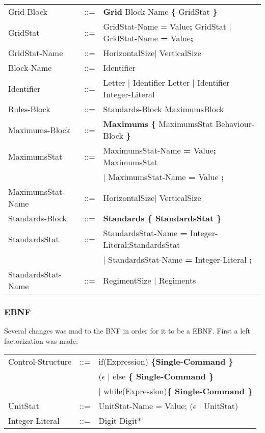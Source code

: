 \begin{tabular}{ l l l }
			Grid-Block		   &	::=	 & {\bf Grid} Block-Name	 {\bf \{} GridStat \bf{\}} \\
			GridStat		   &	::=  & GridStat-Name = Value{\bf ;} GridStat $\mid$ GridStat-Name {\bf =} Value{\bf ;}   \\
			GridStat-Name	   &	::=  & HorizontalSize$\mid$ VerticalSize					\\
			Block-Name		   &	::=  & Identifier							\\
			Identifier		   &    ::=  & Letter $\mid$ Identifier Letter $\mid$ Identifier Integer-Literal \\
			Rules-Block		   &	::=	 & Standards-Block MaximumsBlock 				\\
			Maximums-Block	   &	::=	 & {\bf Maximums} {\bf \{} MaximumsStat Behaviour-Block {\bf \}}	\\
			MaximumsStat	   &	::=  & MaximumsStat-Name {\bf = } Value{\bf ;} MaximumsStat  			\\
							   &		 & $\mid$ MaximumsStat-Name {\bf = } Value {\bf ; }	 			 \\
			MaximumsStat-Name  &	::=  & HorizontalSize$\mid$ VerticalSize							\\
			Standards-Block	   &    ::=  & \bf{Standards} {\bf \{ } StandardsStat \bf{\} }					\\
			StandardsStat	   & 	::=	 & StandardsStat-Name {\bf = } Integer-Literal;StandardsStat 				\\
							   &		 & $\mid$ StandardsStat-Name {\bf = } Integer-Literal {\bf ; } 		\\
			StandardsStat-Name & 	::=	 & RegimentSize	$\mid$ Regiments									 \\
		\end{tabular}
		
	\subsubsection{EBNF}
		Several changes was mad to the BNF in order for it to be a EBNF. First a left factorization was made:
		\begin{tabular}{ l l l }
			Control-Structure  &  	::=  & if(Expression) \bf{\{}Single-Command \bf{\}}  \\
							   &  	     & ($\epsilon$ $\mid$ else \bf{\{ }Single-Command \bf{\} } \\					   
							   &   		 & $\mid$ while(Expression)\bf{\{ } Single-Command \bf{\}} \\
	  		UnitStat		   &	::=  & UnitStat-Name = Value; ($\epsilon$ $\mid$ UnitStat) \\
			Integer-Literal    &	::=  & Digit Digit* 
			
								
		\end{tabular}
							   
							   
